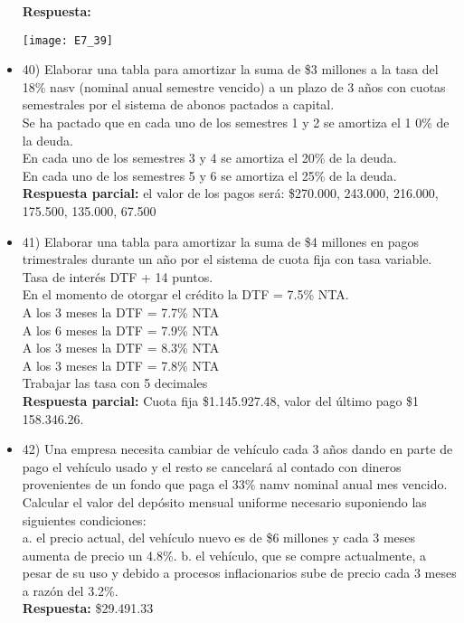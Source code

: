 \begin{itemize}
	\textbf{ Respuesta:}
	\begin{center}
		\texttt{[image: E7\_39]}
	\end{center}
	\medskip
	
	\item 40)  Elaborar una tabla para amortizar la suma de \$3 millones a la tasa del 18\% nasv (nominal anual semestre vencido) a un plazo de 3 años con cuotas semestrales por el sistema de abonos pactados a capital.\\
	
	Se ha pactado que en cada uno de los semestres 1 y 2 se amortiza el 1 0\% de la deuda.\\
	En cada uno de los semestres 3 y 4 se amortiza el 20\% de la deuda. \\
	En cada uno de los semestres 5 y 6 se amortiza el 25\% de la deuda.\\
	
	\textbf{Respuesta parcial:} el valor de los pagos será: \$270.000, 243.000, 216.000, 175.500, 135.000, 67.500
	\medskip
	
	\item 41)  Elaborar una tabla para amortizar la suma de \$4 millones en pagos trimestrales durante un año por el sistema de cuota fija con tasa variable. Tasa de interés DTF + 14 puntos. \\
	
	En el momento de otorgar el crédito la DTF = 7.5\% NTA.\\
	
	A los 3 meses la DTF = 7.7\% NTA\\ 
	A los 6 meses la DTF = 7.9\% NTA \\
	A los 3 meses la DTF = 8.3\% NTA \\
	A los 3 meses la DTF = 7.8\% NTA\\
	Trabajar las tasa con 5 decimales\\
	\textbf{Respuesta parcial:} Cuota fija \$1.145.927.48, valor del último pago \$1 158.346.26.
	\medskip
	
	\item 42)  Una empresa necesita cambiar de vehículo cada 3 años dando en parte de pago el vehículo usado y el resto se cancelará al contado con dineros provenientes de un fondo que paga el 33\% namv nominal anual mes vencido. Calcular el valor del depósito mensual uniforme necesario suponiendo las siguientes condiciones: \\
	
	a.	el precio actual, del vehículo nuevo es de \$6 millones y cada 3 meses aumenta de precio un 4.8\%. 
	b.	el vehículo, que se compre actualmente, a pesar de su uso y debido a procesos inflacionarios sube de precio cada 3 meses a razón del 3.2\%.\\
	\textbf{Respuesta:} \$29.491.33
	\medskip
	

\end{itemize}
